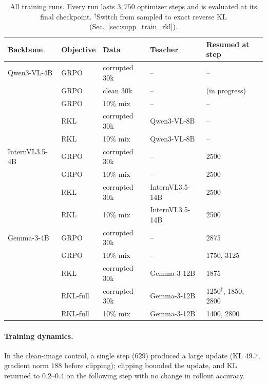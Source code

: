 \begin{table}[t]
\centering\small
\setlength{\tabcolsep}{4pt}
\begin{tabular}{lllll}
\toprule
Backbone & Objective & Data & Teacher & Resumed at step \\
\midrule
Qwen3-VL-4B   & GRPO     & corrupted 30k  & --              & -- \\
              & GRPO     & clean 30k      & --              & (in progress) \\
              & GRPO     & 10\% mix       & --              & -- \\
              & RKL      & corrupted 30k  & Qwen3-VL-8B     & -- \\
              & RKL      & 10\% mix       & Qwen3-VL-8B     & -- \\
\midrule
InternVL3.5-4B& GRPO     & corrupted 30k  & --              & 2500 \\
              & GRPO     & 10\% mix       & --              & 2500 \\
              & RKL      & corrupted 30k  & InternVL3.5-14B & 2500 \\
              & RKL      & 10\% mix       & InternVL3.5-14B & 2500 \\
\midrule
Gemma-3-4B    & GRPO     & corrupted 30k  & --              & 2875 \\
              & GRPO     & 10\% mix       & --              & 1750, 3125 \\
              & RKL      & corrupted 30k  & Gemma-3-12B     & 1875 \\
              & RKL-full & corrupted 30k  & Gemma-3-12B     & 1250$^\dagger$, 1850, 2800 \\
              & RKL-full & 10\% mix       & Gemma-3-12B     & 1400, 2800 \\
\bottomrule
\end{tabular}
\caption{All training runs. Every run lasts $3{,}750$ optimizer steps and is evaluated at
its final checkpoint. $^\dagger$Switch from sampled to exact reverse KL
(Sec.~\ref{sec:supp_train_rkl}).}
\label{tab:supp_train_runs}
\end{table}

\paragraph{Training dynamics.}
In the clean-image control, a single step ($629$) produced a large update (KL $49.7$,
gradient norm $188$ before clipping); clipping bounded the update, and KL returned to
$0.2$--$0.4$ on the following step with no change in rollout accuracy.
